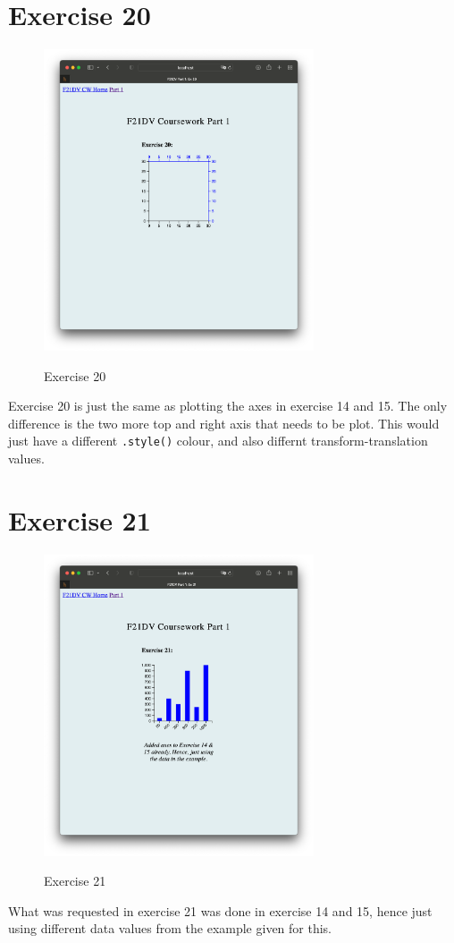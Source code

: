 \documentclass{scrreprt}
\begin{document}
\section{Exercise 20}
\begin{figure}[!ht]
    \centering
    \includegraphics[width = 8cm]{images/ex20.png}
    \label{fig:ex20}
    \caption{Exercise 20}
\end{figure}
\FloatBarrier
% 
Exercise 20 is just the same as plotting the axes in exercise 14 and 15. The only difference is the two 
more top and right axis that needs to be plot. This would just have a different \verb|.style()| colour,
and also differnt transform-translation values.

\newpage
\section{Exercise 21}
\begin{figure}[!ht]
    \centering
    \includegraphics[width = 8cm]{images/ex21.png}
    \label{fig:ex21}
    \caption{Exercise 21}
\end{figure}
\FloatBarrier
% 
What was requested in exercise 21 was done in exercise 14 and 15, hence just using different data values 
from the example given for this. 
\end{document}
